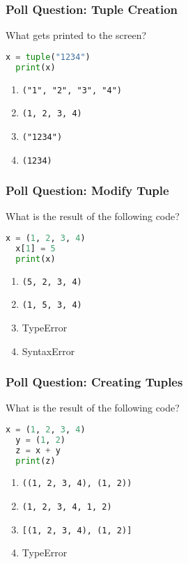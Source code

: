 \documentclass[xcolor=table]{beamer}
\begin{document}
%
%
\begin{frame}[fragile]
  \frametitle{Poll Question: Tuple Creation}
  What gets printed to the screen?
  \begin{lstlisting}[language=Python, autogobble]
  x = tuple("1234")
  print(x)
  \end{lstlisting}
  \vfill
  \begin{enumerate}[A] 
    \item \lstinline|("1", "2", "3", "4")|
    \item \lstinline|(1, 2, 3, 4)|
    \item \lstinline|("1234")|
    \item \lstinline|(1234)|
  \end{enumerate}
\end{frame}


%
%
\begin{frame}[fragile]
  \frametitle{Poll Question: Modify Tuple}
  What is the result of the following code?
  \begin{lstlisting}[language=Python, autogobble]
  x = (1, 2, 3, 4)
  x[1] = 5
  print(x)
  \end{lstlisting}
  \vfill
  \begin{enumerate}[A] 
    \item \lstinline|(5, 2, 3, 4)|
    \item \lstinline|(1, 5, 3, 4)|
    \item TypeError
    \item SyntaxError
  \end{enumerate}
\end{frame}

%
%
\begin{frame}[fragile]
  \frametitle{Poll Question: Creating Tuples} 
  What is the result of the following code?
  \begin{lstlisting}[language=Python, autogobble]
  x = (1, 2, 3, 4)
  y = (1, 2)
  z = x + y
  print(z)
  \end{lstlisting}
  \vfill
  \begin{enumerate}[A] 
    \item \lstinline|((1, 2, 3, 4), (1, 2))|
    \item \lstinline|(1, 2, 3, 4, 1, 2)|
    \item \lstinline|[(1, 2, 3, 4), (1, 2)]|
    \item TypeError
  \end{enumerate}
\end{frame}
\end{document}
